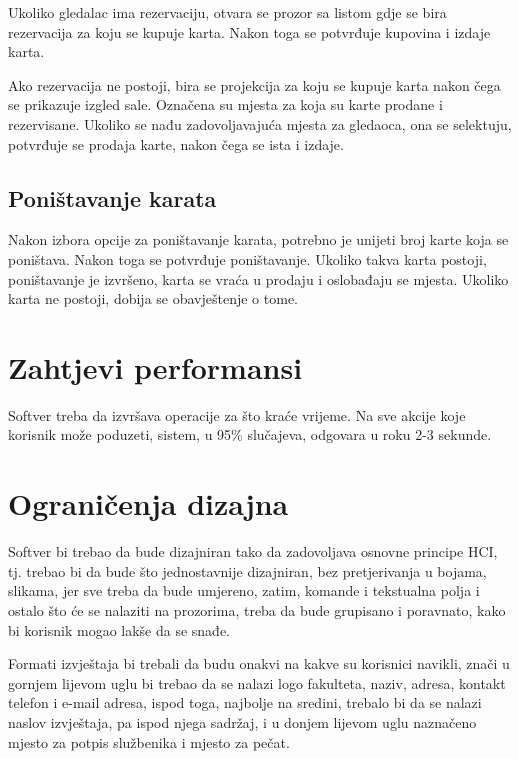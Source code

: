 Ukoliko gledalac ima rezervaciju, otvara se prozor sa listom gdje se bira rezervacija za koju se kupuje karta. Nakon toga se potvrđuje kupovina i izdaje karta.

Ako rezervacija ne postoji, bira se projekcija za koju se kupuje karta nakon čega se prikazuje izgled sale. Označena su mjesta za koja su karte prodane i rezervisane. Ukoliko se nađu zadovoljavajuća mjesta za gledaoca, ona se selektuju, potvrđuje se prodaja karte, nakon čega se ista i izdaje.

\subsection{Poništavanje karata}
Nakon izbora opcije za poništavanje karata, potrebno je unijeti broj karte koja se poništava. Nakon toga se potvrđuje poništavanje. Ukoliko takva karta postoji, poništavanje je izvršeno, karta se vraća u prodaju i oslobađaju se mjesta. Ukoliko karta ne postoji, dobija se obavještenje o tome.

\section{Zahtjevi performansi}
Softver treba da izvršava operacije za što kraće vrijeme. Na sve akcije koje korisnik može poduzeti, sistem, u 95\% slučajeva, 
odgovara u roku 2-3 sekunde.

\section{Ograničenja dizajna}
Softver bi trebao da bude dizajniran tako da zadovoljava osnovne principe HCI,
tj. trebao bi da bude što jednostavnije dizajniran, bez pretjerivanja u bojama,
slikama, jer sve treba da bude umjereno, zatim, komande i tekstualna polja i
ostalo što će se nalaziti na prozorima, treba da bude grupisano i poravnato, kako
bi korisnik mogao lakše da se snađe.

Formati izvještaja bi trebali da budu onakvi na kakve su korisnici navikli, znači u
gornjem lijevom uglu bi trebao da se nalazi logo fakulteta, naziv, adresa, kontakt
telefon i e-mail adresa, ispod toga, najbolje na sredini, trebalo bi da se nalazi
naslov izvještaja, pa ispod njega sadržaj, i u donjem lijevom uglu naznačeno
mjesto za potpis službenika i mjesto za pečat.

